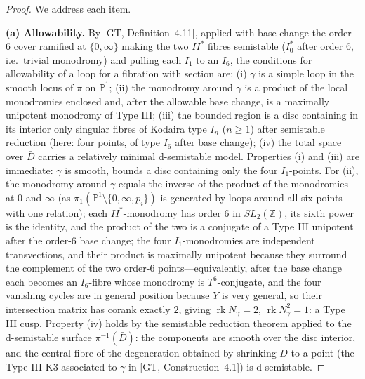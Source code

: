 \documentclass[11pt]{article}
\newcommand{\PP}{\mathbb{P}}
\newcommand{\bZ}{\mathbb{Z}}
\DeclareMathOperator{\rk}{rk}
\begin{document}
\begin{proof}
We address each item.

\textbf{(a) Allowability.} By [GT, Definition~4.11], applied with base
change the order-$6$ cover ramified at $\{0,\infty\}$ making the two $II^*$
fibres semistable ($I_0^*$ after order $6$, i.e.\ trivial monodromy) and
pulling each $I_1$ to an $I_6$, the conditions for allowability of a loop
for a fibration with section are: (i) $\gamma$ is a simple loop in the
smooth locus of $\pi$ on $\PP^1$; (ii) the monodromy around $\gamma$ is a
product of the local monodromies enclosed and, after the allowable base
change, is a maximally unipotent monodromy of Type III; (iii) the bounded
region is a disc containing in its interior only singular fibres of Kodaira
type $I_n$ ($n\ge1$) after semistable reduction (here: four points, of type
$I_6$ after base change); (iv) the total space over $\bar D$ carries a
relatively minimal d-semistable model. Properties (i) and (iii) are
immediate: $\gamma$ is smooth, bounds a disc containing only the four
$I_1$-points. For (ii), the monodromy around $\gamma$ equals the inverse of
the product of the monodromies at $0$ and $\infty$ (as
$\pi_1(\PP^1\setminus\{0,\infty,p_i\})$ is generated by loops around all
six points with one relation); each $II^*$-monodromy has order $6$ in
$SL_2(\bZ)$, its sixth power is the identity, and the product of the two is
a conjugate of a Type III unipotent after the order-$6$ base change; the
four $I_1$-monodromies are independent transvections, and their product is
maximally unipotent because they surround the complement of the two
order-$6$ points---equivalently, after the base change each becomes an
$I_6$-fibre whose monodromy is $T^6$-conjugate, and the four vanishing
cycles are in general position because $Y$ is very general, so their
intersection matrix has corank exactly $2$, giving $\rk N_\gamma =
2$, $\rk N_\gamma^2 = 1$: a Type III cusp. Property (iv) holds by the
semistable reduction theorem applied to the d-semistable surface
$\pi^{-1}(\bar D)$: the components are smooth over the disc interior, and
the central fibre of the degeneration obtained by shrinking $D$ to a point
(the Type III K3 associated to $\gamma$ in [GT, Construction~4.1]) is
d-semistable.


\end{proof}
\end{document}
